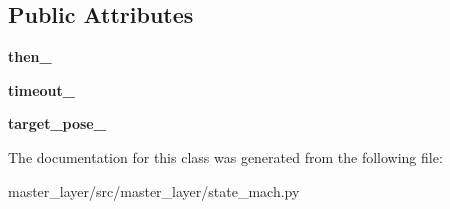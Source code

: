 \subsection*{Public Attributes}
\begin{DoxyCompactItemize}
\item 
\mbox{\label{classmaster__layer_1_1state__mach_1_1MoveToXYZ_a4ee2445296b2d7d9bbe9855a3d1b763d}} 
{\bfseries then\+\_\+}
\item 
\mbox{\label{classmaster__layer_1_1state__mach_1_1MoveToXYZ_ac93e574fe5fceb9f68f43da1ed1b5de4}} 
{\bfseries timeout\+\_\+}
\item 
\mbox{\label{classmaster__layer_1_1state__mach_1_1MoveToXYZ_a793e986622ff1433b868617f628dc268}} 
{\bfseries target\+\_\+pose\+\_\+}
\end{DoxyCompactItemize}


The documentation for this class was generated from the following file\+:\begin{DoxyCompactItemize}
\item 
master\+\_\+layer/src/master\+\_\+layer/state\+\_\+mach.\+py\end{DoxyCompactItemize}
